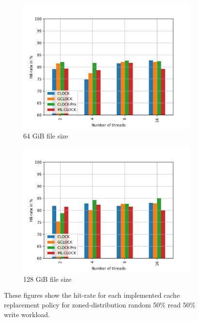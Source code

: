 \documentclass[
	12pt,
	a4paper,
	abstract,
	bibliography=totoc,
	chapterprefix,
	headings=openright,
	numbers=endperiod,
	parskip=half,
	twoside,
]{scrreprt}
\begin{document}
\begin{figure}[H]
\begin{subfigure}{0.4\textwidth}
		\includegraphics[width=\textwidth]{multi_64_gb_rw_50to50_zoned.jpg}		
		\caption{64 GiB file size}
		\label{fig:rw_90to10  zoned}
	\end{subfigure}
	\hfill
	\begin{subfigure}{0.4\textwidth}
		\includegraphics[width=\textwidth]{multi_128_gb_rw_50to50_zoned.jpg}		
		\caption{128 GiB file size}
		\label{fig:rw_90to10  uniform}
	\end{subfigure}
	\caption{These figures show the hit-rate for each implemented cache replacement policy for zoned-distribution random 50\% read 50\% write workload.}
\end{figure}

\end{document}
